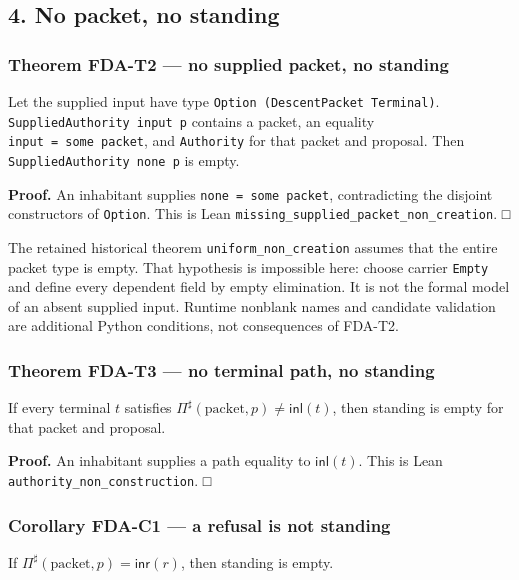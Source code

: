 \documentclass[
  11pt,
]{article}
\begin{document}
\subsection{4. No packet, no standing}\label{no-packet-no-standing}

\subsubsection{Theorem FDA-T2 --- no supplied packet, no standing}\label{theorem-fda-t2-no-supplied-packet-no-standing}

Let the supplied input have type \texttt{Option\ (DescentPacket\ Terminal)}. \texttt{SuppliedAuthority\ input\ p} contains a packet, an equality \texttt{input\ =\ some\ packet}, and \texttt{Authority} for that packet and proposal. Then \texttt{SuppliedAuthority\ none\ p} is empty.

\textbf{Proof.} An inhabitant supplies \texttt{none\ =\ some\ packet}, contradicting the disjoint constructors of \texttt{Option}. This is Lean \nolinkurl{missing_supplied_packet_non_creation}. □

The retained historical theorem \nolinkurl{uniform_non_creation} assumes that the entire packet type is empty. That hypothesis is impossible here: choose carrier \texttt{Empty} and define every dependent field by empty elimination. It is not the formal model of an absent supplied input. Runtime nonblank names and candidate validation are additional Python conditions, not consequences of FDA-T2.

\subsubsection{Theorem FDA-T3 --- no terminal path, no standing}\label{theorem-fda-t3-no-terminal-path-no-standing}

If every terminal \(t\) satisfies \(\Pi^\sharp(\mathrm{packet},p)\neq\mathsf{inl}(t)\), then standing is empty for that packet and proposal.

\textbf{Proof.} An inhabitant supplies a path equality to \(\mathsf{inl}(t)\). This is Lean \nolinkurl{authority_non_construction}. □

\subsubsection{Corollary FDA-C1 --- a refusal is not standing}\label{corollary-fda-c1-a-refusal-is-not-standing}

If \(\Pi^\sharp(\mathrm{packet},p)=\mathsf{inr}(r)\), then standing is empty.
\end{document}

